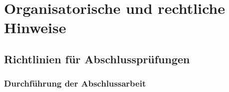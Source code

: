 \chapter{Organisatorische und rechtliche Hinweise}

\section{Richtlinien für Abschlussprüfungen}
\subsection{Durchführung der Abschlussarbeit}

